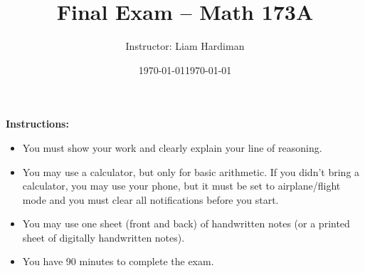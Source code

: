 \documentclass[11pt]{article}
\date{\today}
\title{Final Exam -- Math 173A}
\author{Instructor: Liam Hardiman}
\date{\today}
\theoremstyle{plain}
\begin{document}
\maketitle


{\bf Instructions: } \begin{itemize} 
\item You must show your work and clearly
explain your line of reasoning.
\item You may use a calculator, but only for basic arithmetic.
If you didn't bring a calculator, you may use your phone, but it must be set to airplane/flight mode and you must clear all notifications before you start.
\item You may use one sheet (front and back) of handwritten notes (or a printed sheet of digitally handwritten notes).
\item You have 90 minutes to complete the exam.
\end{itemize}

\medskip
\medskip


\newpage
\ 
\newpage

\end{document}
